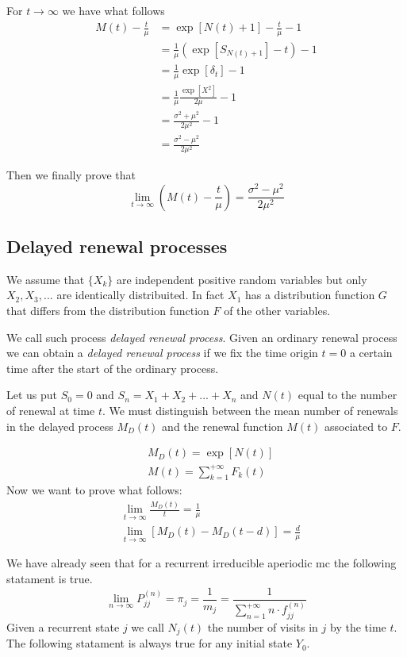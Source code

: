 For $t \rightarrow \infty$ we have what follows
\begin{align*}
	M(t)-\frac{t}{\mu} & =\exp[N(t)+1]-\frac{t}{\mu}-1 \\
	& = \frac{1}{\mu} (\exp[S_{N(t)+1}]-t)-1 \\
	& = \frac{1}{\mu} \exp[\delta_t]-1 \\
	& = \frac{1}{\mu}\frac{\exp[X^2]}{2\mu}-1 \\
	& = \frac{\sigma^2+\mu^2}{2\mu^2}-1 \\
	& = \frac{\sigma^2-\mu^2}{2\mu^2}
\end{align*}

Then we finally prove that
\begin{equation}
	\lim_{t \rightarrow \infty} \left( M(t) - \frac{t}{\mu} \right) = \frac{\sigma^2-\mu^2}{2\mu^2}
\end{equation}

\subsection{Delayed renewal processes}
	We assume that $\{X_k\}$ are independent positive random variables but only $X_2,X_3,...$ are identically distribuited.
	In fact $X_1$ has a distribution function $G$ that differs from the distribution function $F$ of the other variables.

	We call such process \textit{delayed renewal process}. Given an ordinary renewal process we can obtain a \textit{delayed renewal process} if we fix the time origin $t=0$ a certain time after the start of the ordinary process.

	Let us put $S_0=0$ and $S_n=X_1+X_2+...+X_n$ and $N(t)$ equal to the number of renewal at time $t$. We must distinguish between the mean number of renewals in the delayed process $M_D(t)$ and the renewal function  $M(t)$ associated to $F$.

	\begin{align}
		& M_D(t) = \exp[N(t)]
		\\ & M(t) = \sum_{k=1}^{+\infty}F_k(t)
	\end{align}
	Now we want to prove what follows:
	\begin{align*}
		& \lim_{t \to \infty }\frac{M_D(t)}{t}=\frac{1}{\mu}
		\\ & \lim_{t \to \infty }[M_D(t)-M_D(t-d)]=\frac{d}{\mu}
	\end{align*}

	We have already seen that for a recurrent irreducible aperiodic \gls{mc} the following statament is true.
	\begin{equation}
		\lim_{n \to \infty} P_{jj}^{(n)}=\pi_j=\frac{1}{m_j}=\frac{1}{\sum_{n=1}^{+\infty}n \cdot f_{jj}^{(n)}}
	\end{equation}
	Given a recurrent state $j$ we call $N_j(t)$ the number of visits in $j$ by the time $t$. The following statament is always true for any initial state $Y_0$.

